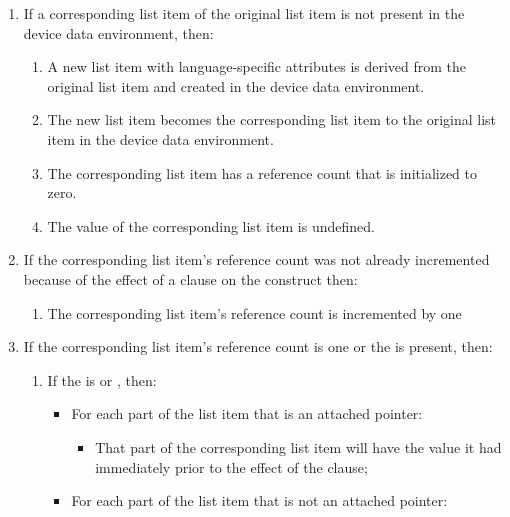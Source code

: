\begin{enumerate}
\item If a corresponding list item of the original list item is not present in the device data environment, then:
\begin{enumerate}
\item A new list item with language-specific attributes is derived from the original list item and created in the device data environment.
\item The new list item becomes the corresponding list item to the original list item in the device data environment.
\item The corresponding list item has a reference count that is initialized to zero.
\item The value of the corresponding list item is undefined.
\end{enumerate}

\item If the corresponding list item's reference count was not already
incremented because of the effect of a  clause on the
construct then:
\begin{enumerate}
\item The corresponding list item's reference count is incremented by one
\end{enumerate}

\item If the corresponding list item's reference count is one or the   is present, then:
\begin{enumerate}
\item If the  is  or , then:
    \begin{itemize}

    \item For each part of the list item that is an attached pointer:  \begin{itemize}

        \item That part of the corresponding list item will
        have the value it had immediately prior to the effect of the  clause;

   \end{itemize}

    \item For each part of the list item that is not an attached pointer: \begin{itemize}


\end{itemize}
\end{itemize}
\end{enumerate}
\end{enumerate}
